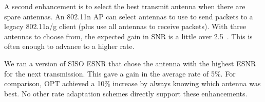 A second enhancement is to select the best transmit antenna when there are spare antennas. %
An 802.11n AP can select antennas to use to send packets to a legacy 802.11a/g client (plus use all antennas to receive packets). With three antennas to choose from, the expected gain in SNR is a little over 2.5\dB~\cite{Goldsmith}. This is often enough to advance to a higher rate.

We ran a version of SISO ESNR that chose the antenna with the highest ESNR for the next transmission. This gave a gain in the average rate of 5\%.  For comparison, OPT achieved a 10\% increase by always knowing which antenna was best. No other rate adaptation schemes directly support these enhancements.

\ifx\mainfile\undefined

\fi
